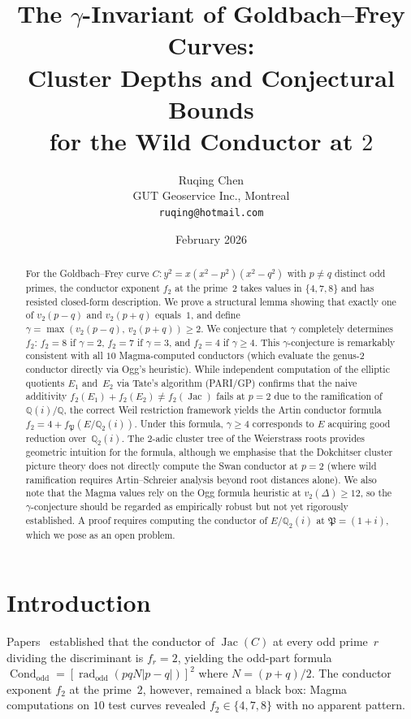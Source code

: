 \documentclass[11pt,a4paper]{article}
\title{The $\gamma$-Invariant of Goldbach--Frey Curves:\\
  Cluster Depths and Conjectural Bounds\\
  for the Wild Conductor at $2$}
\author{Ruqing Chen\\[4pt]
  \small GUT Geoservice Inc., Montreal\\
  \small\texttt{ruqing@hotmail.com}}
\date{February 2026}
\newcommand{\rad}{\operatorname{rad}}
\newcommand{\Jac}{\operatorname{Jac}}
\newcommand{\Cond}{\operatorname{Cond}}
\theoremstyle{definition}
\theoremstyle{remark}
\begin{document}
\maketitle

\begin{abstract}
For the Goldbach--Frey curve
$C\colon y^2 = x(x^2 - p^2)(x^2 - q^2)$ with $p \ne q$
distinct odd primes, the conductor exponent $f_2$ at the
prime~$2$ takes values in $\{4, 7, 8\}$ and has resisted
closed-form description.  We prove a structural lemma
showing that exactly one of $v_2(p-q)$ and $v_2(p+q)$
equals~$1$, and define
$\gamma = \max(v_2(p-q),\, v_2(p+q)) \ge 2$.
We conjecture that $\gamma$ completely determines $f_2$:
$f_2 = 8$ if $\gamma = 2$, $f_2 = 7$ if $\gamma = 3$,
and $f_2 = 4$ if $\gamma \ge 4$.
This $\gamma$-conjecture is remarkably consistent with
all $10$ Magma-computed conductors (which evaluate the
genus-$2$ conductor directly via Ogg's heuristic).
While independent computation of the elliptic quotients
$E_1$ and~$E_2$ via Tate's algorithm (PARI/GP) confirms
that the naive additivity
$f_2(E_1) + f_2(E_2) \ne f_2(\Jac)$ fails at $p = 2$
due to the ramification of $\mathbb{Q}(i)/\mathbb{Q}$,
the correct Weil restriction framework yields the
Artin conductor formula
$f_2 = 4 + f_{\mathfrak{P}}(E/\mathbb{Q}_2(i))$.
Under this formula, $\gamma \ge 4$ corresponds to $E$
acquiring good reduction over~$\mathbb{Q}_2(i)$.
The $2$-adic cluster tree of the Weierstrass roots
provides geometric intuition for the formula, although
we emphasise that the Dokchitser cluster picture theory
does not directly compute the Swan conductor at $p = 2$
(where wild ramification requires Artin--Schreier
analysis beyond root distances alone).
We also note that the Magma values
rely on the Ogg formula heuristic at $v_2(\Delta) \ge 12$,
so the $\gamma$-conjecture should be regarded as
empirically robust but not yet rigorously established.
A proof requires computing the conductor of
$E/\mathbb{Q}_2(i)$ at $\mathfrak{P} = (1{+}i)$,
which we pose as an open problem.
\end{abstract}


\section{Introduction}

Papers~\cite{Chen2026TCV,Chen2026UTS} established that
the conductor of $\Jac(C)$ at every odd prime~$r$
dividing the discriminant is $f_r = 2$, yielding the
odd-part formula
$\Cond_{\mathrm{odd}} =
[\rad_{\mathrm{odd}}(pqN|p{-}q|)]^2$ where $N = (p+q)/2$.
The conductor exponent $f_2$ at the prime~$2$, however,
remained a black box: Magma computations on $10$ test
curves revealed $f_2 \in \{4, 7, 8\}$ with no apparent
pattern.
\end{document}
